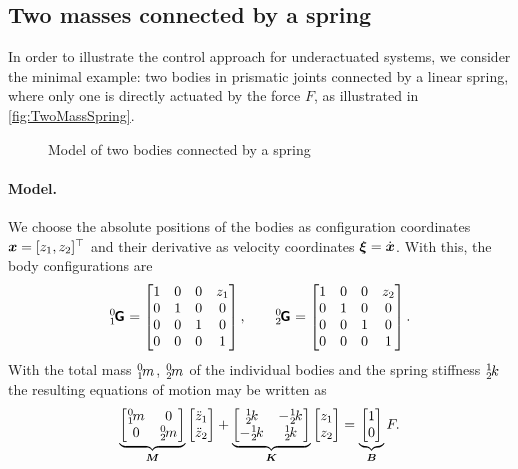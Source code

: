 \subsection{Two masses connected by a spring}
In order to illustrate the control approach for underactuated systems, we consider the minimal example:
two bodies in prismatic joints connected by a linear spring, where only one is directly actuated by the force $F$, as illustrated in \autoref{fig:TwoMassSpring}.
\begin{figure}[ht]
 \centering
 
 \caption{Model of two bodies connected by a spring}
 \label{fig:TwoMassSpring}
\end{figure}

\paragraph{Model.}
We choose the absolute positions of the bodies as configuration coordinates $\boldsymbol{x} = [z_1, z_2]^\top$ and their derivative as velocity coordinates $\boldsymbol{\xi} = \dot{\boldsymbol{x}}$.
With this, the body configurations are
\begin{align}
 \bodyHomoCoord{0}{1} = \begin{bmatrix} 1 & 0 & 0 & z_1 \\ 0 & 1 & 0 & 0 \\ 0 & 0 & 1 & 0 \\ 0 & 0 & 0 & 1\end{bmatrix},
\qquad
 \bodyHomoCoord{0}{2} = \begin{bmatrix} 1 & 0 & 0 & z_2 \\ 0 & 1 & 0 & 0 \\ 0 & 0 & 1 & 0 \\ 0 & 0 & 0 & 1\end{bmatrix}.
\end{align}
With the total mass $\bodyMass{0}{1}$, $\bodyMass{0}{2}$ of the individual bodies and the spring stiffness $\bodyStiffness{1}{2}$ the resulting equations of motion may be written as
\begin{align}\label{eq:TwoMassSpringModel}
 \underbrace{\begin{bmatrix} \bodyMass{0}{1} & 0 \\ 0 & \bodyMass{0}{2} \end{bmatrix}}_{\sysInertiaMat}
 \begin{bmatrix} \ddot{z}_1 \\ \ddot{z}_2 \end{bmatrix}
 +
 \underbrace{\begin{bmatrix} \bodyStiffness{1}{2} & -\bodyStiffness{1}{2} \\ -\bodyStiffness{1}{2} & \bodyStiffness{1}{2} \end{bmatrix}}_{\sysStiffMat}
 \begin{bmatrix} z_1 \\ z_2 \end{bmatrix} 
 =
 \underbrace{\begin{bmatrix} 1 \\ 0 \end{bmatrix}}_{\sysInputMat} F
 .
\end{align}
